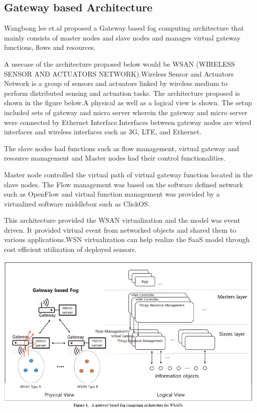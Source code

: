 \documentclass{article}
\begin{document}
\subsection{Gateway based Architecture}
Wangbong lee et.al\cite{lee2016gateway} proposed a Gateway based fog computing architecture that mainly consists of master nodes and slave nodes and manages virtual gateway functions, flows and resources.

A usecase of the architecture proposed below would be WSAN (WIRELESS SENSOR AND ACTUATORS NETWORK).Wireless Sensor and Actuators Network is a group of sensors and actuators linked by wireless medium to perform distributed sensing and actuation tasks. 
The architecture proposed is shown in the figure below.A physical as well as a logical view is shown. The setup included sets of gateway and micro server wherein the gateway and micro server were connected by Ethernet Interface.Interfaces between gateway nodes are wired interfaces and wireless interfaces such as 3G, LTE, and Ethernet\cite{lee2016gateway}.

The slave nodes had functions such as flow management, virtual gateway and resource management and Master nodes had their control functionalities. 

Master node controlled the virtual path of virtual gateway function located in the slave nodes. The Flow management was based on the software defined network such as OpenFlow and virtual function management was provided by a virtualized software middlebox such as ClickOS\cite{lee2016gateway}. 

This architecture provided the WSAN virtualization and the model was event driven. It provided virtual event from networked objects and shared them to various applications.WSN virtualization can help realize the SaaS model through cost efficient utilization of deployed sensors\cite{lee2016gateway}. 

\includegraphics[scale=0.7]{gateway.png}
\end{document}
